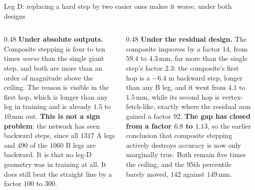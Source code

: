 \documentclass[aspectratio=169,10pt]{beamer}
\newcommand{\mm}{\ensuremath{\,\mathrm{mm}}}
\newcommand{\hl}[1]{{\color{accent}\textbf{#1}}}
\begin{document}
\begin{frame}[shrink=25]{Leg D: replacing a hard step by two easier ones makes it worse, under both designs}
  \begin{columns}[T]
    \begin{column}{0.48\textwidth}
      {\small \textbf{Under absolute outputs.} Composite stepping is four to ten
       times \emph{worse} than the single giant step, and both are more than an
       order of magnitude above the ceiling. The reason is visible in the first
       hop, which is longer than any leg in training and is already $1.5$ to
       $10\mm$ out. \hl{This is not a sign problem}: the network has seen
       backward steps, since all $1317$ A legs and $490$ of the $1060$ B legs
       are backward. It is that no leg-D geometry was in training at all. It
       does still beat the straight line by a factor $100$ to $300$.}
    \end{column}
    \begin{column}{0.48\textwidth}
      {\small \textbf{Under the residual design.} The composite improves by a
       factor $14$, from $59.4$ to $4.3\mm$, far more than the single step's
       factor $2.3$: the composite's first hop is a $-6.4$ m backward step,
       longer than any B leg, and it went from $4.1$ to $1.5\mm$, while its
       second hop is vertex-fetch-like, exactly where the residual arm gained a
       factor $92$. \hl{The gap has closed from a factor $6.8$ to $1.13$}, so
       the earlier conclusion that composite stepping actively destroys accuracy
       is now only marginally true. Both remain five times the ceiling, and the
       95th percentile barely moved, $142$ against $149\mm$.}
    \end{column}
  \end{columns}
\end{frame}
\end{document}
